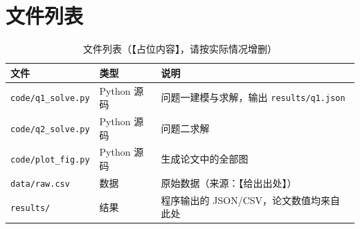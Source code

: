 \documentclass[12pt,a4paper,fontset=windows]{ctexart}
\begin{document}


\newpage
\appendix
\section{文件列表}
\begin{table}[htbp]
  \centering
  \caption{文件列表（【占位内容】，请按实际情况增删）}
  \label{tab:files}
  \begin{tabular}{llp{7.2cm}}
    \toprule
    文件 & 类型 & 说明 \\
    \midrule
    \texttt{code/q1\_solve.py} & Python 源码 & 问题一建模与求解，输出 \texttt{results/q1.json} \\
    \texttt{code/q2\_solve.py} & Python 源码 & 问题二求解 \\
    \texttt{code/plot\_fig.py} & Python 源码 & 生成论文中的全部图 \\
    \texttt{data/raw.csv}      & 数据       & 原始数据（来源：【给出出处】） \\
    \texttt{results/}          & 结果        & 程序输出的 JSON/CSV，论文数值均来自此处 \\
    \bottomrule
  \end{tabular}
\end{table}
\end{document}

